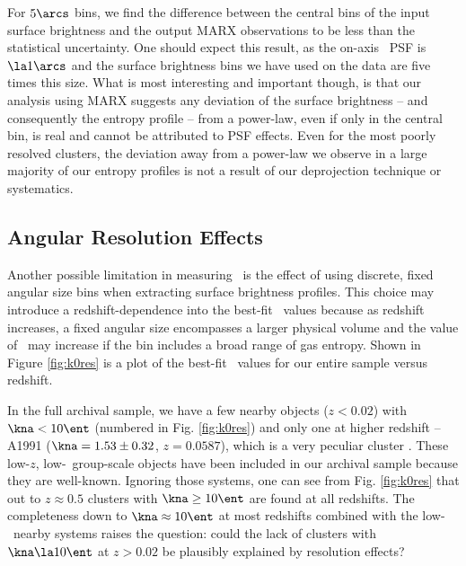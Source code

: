 \documentclass{emulateapj}
\begin{document}
For $5\arcs$ bins, we find the difference between the central bins of
the input surface brightness and the output MARX observations to be
less than the statistical uncertainty. One should expect this result,
as the on-axis \chandra\ PSF is $\la 1\arcs$ and the surface
brightness bins we have used on the data are five times this
size. What is most interesting and important though, is that our
analysis using MARX suggests any deviation of the surface brightness
-- and consequently the entropy profile -- from a power-law, even if
only in the central bin, is real and cannot be attributed to PSF
effects. Even for the most poorly resolved clusters, the deviation
away from a power-law we observe in a large majority of our entropy
profiles is not a result of our deprojection technique or systematics.

\subsection{Angular Resolution Effects}
\label{sec:angres}

Another possible limitation in measuring \kna\ is the effect of using
discrete, fixed angular size bins when extracting surface brightness
profiles. This choice may introduce a redshift-dependence into the
best-fit \kna\ values because as redshift increases, a fixed angular
size encompasses a larger physical volume and the value of \kna\ may
increase if the bin includes a broad range of gas entropy. Shown in
Figure \ref{fig:k0res} is a plot of the best-fit \kna\ values for our
entire sample versus redshift.

In the full archival sample, we have a few nearby objects ($z < 0.02$)
with $\kna < 10 \ent$ (numbered in Fig. \ref{fig:k0res}) and only one
at higher redshift -- A1991 ($\kna = 1.53 \pm 0.32$, $z = 0.0587$),
which is a very peculiar cluster \citep{2004ApJ...613..180S}. These
low-$z$, low-\kna\ group-scale objects have been included in our
archival sample because they are well-known. Ignoring those systems,
one can see from Fig. \ref{fig:k0res} that out to $z \approx 0.5$
clusters with $\kna \geq 10 \ent$ are found at all redshifts. The
completeness down to $\kna \approx 10 \ent$ at most redshifts combined
with the low-\kna\ nearby systems raises the question: could the lack
of clusters with $\kna \la 10 \ent$ at $z > 0.02$ be plausibly
explained by resolution effects?
\end{document}
